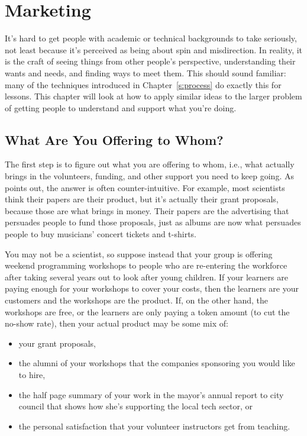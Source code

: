 \chapter{Marketing}\label{s:marketing}

It's hard to get people with academic or technical backgrounds to take
 seriously, not least because it's perceived
as being about spin and misdirection. In reality, it is the craft of
seeing things from other people's perspective, understanding their
wants and needs, and finding ways to meet them. This should sound
familiar: many of the techniques introduced in Chapter~\ref{s:process}
do exactly this for lessons. This chapter will look at how to apply
similar ideas to the larger problem of getting people to understand
and support what you're doing.

\section{What Are You Offering to Whom?}\label{s:marketing-what-whom}

The first step is to figure out what you are offering to whom, i.e.,
what actually brings in the volunteers, funding, and other support you
need to keep going. As \cite{Kuch2011} points out, the answer is
often counter-intuitive. For example, most scientists think their papers
are their product, but it's actually their grant proposals, because
those are what brings in money. Their papers are the advertising that
persuades people to fund those proposals, just as albums are now what
persuades people to buy musicians' concert tickets and t-shirts.

You may not be a scientist, so suppose instead that your group is
offering weekend programming workshops to people who are re-entering the
workforce after taking several years out to look after young children.
If your learners are paying enough for your workshops to cover your
costs, then the learners are your customers and the workshops are the
product. If, on the other hand, the workshops are free, or the learners
are only paying a token amount (to cut the no-show rate), then your
actual product may be some mix of:

\begin{itemize}
\item
  your grant proposals,
\item
  the alumni of your workshops that the companies sponsoring you would
  like to hire,
\item
  the half page summary of your work in the mayor's annual report to
  city council that shows how she's supporting the local tech sector,
  or
\item
  the personal satisfaction that your volunteer instructors get from
  teaching.
\end{itemize}

